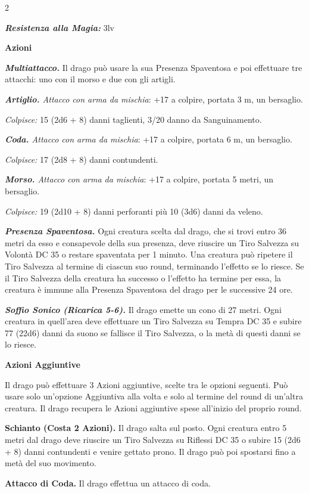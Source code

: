\begin{multicols}{2}
{\emph{\textbf{Resistenza alla Magia:}} 3lv

\textbf{Azioni}

\emph{\textbf{Multiattacco.}} Il drago può usare la sua Presenza Spaventosa e poi effettuare tre attacchi: uno con il morso e due con gli artigli.

\emph{\textbf{Artiglio.} Attacco con arma da mischia}: +17 a colpire, portata 3 m, un bersaglio.

\emph{Colpisce:} 15 (2d6 + 8) danni taglienti, 3/20 danno da Sanguinamento.

\emph{\textbf{Coda.} Attacco con arma da mischia}: +17 a colpire, portata 6 m, un bersaglio.

\emph{Colpisce:} 17 (2d8 + 8) danni contundenti.

\emph{\textbf{Morso.} Attacco con arma da mischia}: +17 a colpire, portata 5 metri, un bersaglio.

\emph{Colpisce:} 19 (2d10 + 8) danni perforanti più 10 (3d6) danni da veleno.

\emph{\textbf{Presenza Spaventosa.}} Ogni creatura scelta dal drago, che si trovi entro 36 metri da esso e consapevole della sua presenza, deve riuscire un Tiro Salvezza su Volontà DC 35 o restare spaventata per 1 minuto. Una creatura può ripetere il Tiro Salvezza al termine di ciascun suo round, terminando l'effetto se lo riesce. Se il Tiro Salvezza della creatura ha successo o l'effetto ha termine per essa, la creatura è immune alla Presenza Spaventosa del drago per le successive 24 ore.

\emph{\textbf{Soffio Sonico (Ricarica 5-6).}} Il drago emette un cono di 27 metri. Ogni creatura in quell'area deve effettuare un Tiro Salvezza su Tempra DC 35 e subire 77 (22d6) danni da suono se fallisce il Tiro Salvezza, o la metà di questi danni se lo riesce.

\textbf{Azioni Aggiuntive}

Il drago può effettuare 3 Azioni aggiuntive, scelte tra le opzioni seguenti. Può usare solo un'opzione Aggiuntiva alla volta e solo al termine del round di un'altra creatura. Il drago recupera le Azioni aggiuntive spese all'inizio del proprio round.

\textbf{Schianto (Costa 2 Azioni).} Il drago salta sul posto. Ogni creatura entro 5 metri dal drago deve riuscire un Tiro Salvezza su Riflessi DC 35 o subire 15 (2d6 + 8) danni contundenti e venire gettato prono. Il drago può poi spostarsi fino a metà del suo movimento.

\textbf{Attacco di Coda.} Il drago effettua un attacco di coda.

}
\end{multicols}
